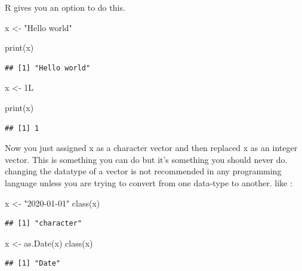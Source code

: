 \documentclass[
]{book}
\newenvironment{Shaded}{\begin{snugshade}}{\end{snugshade}}
\newcommand{\FunctionTok}[1]{\textcolor[rgb]{0.00,0.00,0.00}{#1}}
\newcommand{\NormalTok}[1]{#1}
\newcommand{\OtherTok}[1]{\textcolor[rgb]{0.56,0.35,0.01}{#1}}
\newcommand{\StringTok}[1]{\textcolor[rgb]{0.31,0.60,0.02}{#1}}
\begin{document}
R gives you an option to do this.

\begin{Shaded}
\begin{Highlighting}[]
\NormalTok{x }\OtherTok{\textless{}{-}} \StringTok{"Hello world"}

\FunctionTok{print}\NormalTok{(x)}
\end{Highlighting}
\end{Shaded}

\begin{verbatim}
## [1] "Hello world"
\end{verbatim}

\begin{Shaded}
\begin{Highlighting}[]
\NormalTok{x }\OtherTok{\textless{}{-}}\NormalTok{ 1L}

\FunctionTok{print}\NormalTok{(x)}
\end{Highlighting}
\end{Shaded}

\begin{verbatim}
## [1] 1
\end{verbatim}

Now you just assigned x as a character vector and then replaced x as an integer vector. This is something you can do but it's something you should never do. changing the datatype of a vector is not recommended in any programming language unless you are trying to convert from one data-type to another. like :

\begin{Shaded}
\begin{Highlighting}[]
\NormalTok{x }\OtherTok{\textless{}{-}} \StringTok{"2020{-}01{-}01"}
\FunctionTok{class}\NormalTok{(x)}
\end{Highlighting}
\end{Shaded}

\begin{verbatim}
## [1] "character"
\end{verbatim}

\begin{Shaded}
\begin{Highlighting}[]
\NormalTok{x }\OtherTok{\textless{}{-}} \FunctionTok{as.Date}\NormalTok{(x)}
\FunctionTok{class}\NormalTok{(x)}
\end{Highlighting}
\end{Shaded}

\begin{verbatim}
## [1] "Date"
\end{verbatim}
\end{document}
